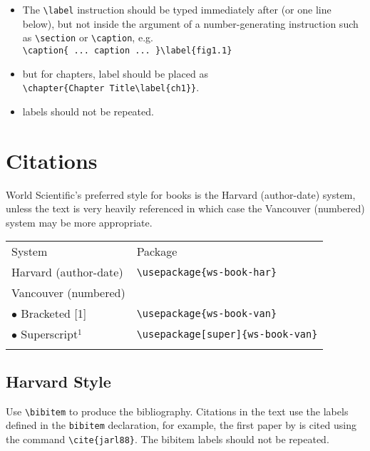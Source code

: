 \begin{itemize}
\item The \verb|\label| instruction should be typed
immediately after (or one line below), but not inside the argument of
a number-generating instruction such as \verb|\section| or \verb|\caption|, e.g.\\
\verb|\caption{ ... caption ... }\label{fig1.1}|
\item but for chapters, label should be placed as\\
    \verb|\chapter{Chapter Title\label{ch1}}|.
\item labels should not be repeated.
\end{itemize}

\section{Citations}

World Scientific's preferred style for books is the Harvard (author-date) system,
unless the text is very heavily referenced in which case the
Vancouver (numbered) system may be more appropriate.

\begin{center}
\tablefont
\begin{tabular}{@{}ll@{}}\toprule
System & Package\\\colrule
 Harvard (author-date) & \verb|\usepackage{ws-book-har}|\\
 Vancouver (numbered)\\
 \quad$\bullet$ Bracketed [1] & \verb|\usepackage{ws-book-van}|\\
 \quad$\bullet$ Superscript$^1$ & \verb|\usepackage[super]{ws-book-van}|\\\botrule
\end{tabular}
\end{center}

\subsection{Harvard Style}

Use \verb|\bibitem| to produce the bibliography.  Citations in the
text use the labels defined in the \verb|bibitem| declaration, for example,
the first paper by \cite{jarl88} is cited using the command
\verb|\cite{jarl88}|. The bibitem labels should not be repeated.

